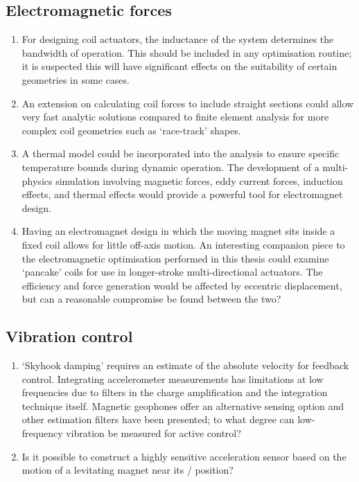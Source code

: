 \documentclass[10pt,a4paper]{memoir}
\begin{document}
\subsection{Electromagnetic forces}

\begin{enumerate}
\item For designing coil actuators, the inductance of the system determines the bandwidth of operation.
This should be included in any optimisation routine; it is suspected this will have significant effects on the suitability of certain geometries in some cases.

\item An extension on calculating coil forces to include straight sections could allow very fast analytic solutions compared to finite element analysis for more complex coil geometries such as `race-track' shapes.

\item A thermal model could be incorporated into the analysis to ensure specific temperature bounds during dynamic operation.
The development of a multi-physics simulation involving magnetic forces, eddy current forces, induction effects, and thermal effects would provide a powerful tool for electromagnet design.

\item Having an electromagnet design in which the moving magnet sits inside a fixed coil allows for little off-axis motion.
An interesting companion piece to the electromagnetic optimisation performed in this thesis could examine `pancake' coils for use in longer-stroke multi-directional actuators.
The efficiency and force generation would be affected by eccentric displacement, but can a reasonable compromise be found between the two?
\end{enumerate}

\subsection{Vibration control}

\begin{enumerate}
\item
`Skyhook damping' requires an estimate of the absolute velocity for feedback control.
Integrating accelerometer measurements has limitations at low frequencies due to filters in the charge amplification and the integration technique itself.
Magnetic geophones offer an alternative sensing option and other estimation filters have been presented; to what degree can low-frequency vibration be measured for active control?

\item
Is it possible to construct a highly sensitive acceleration sensor based on the motion of a levitating magnet near its \qzs/ position?
\end{enumerate}
\end{document}
